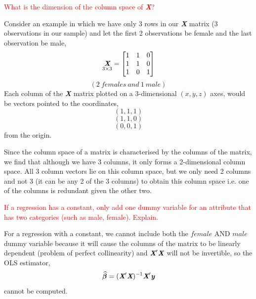 \documentclass[12pt]{report}
\begin{document}
\noindent \textcolor{red}
{
	What is the dimension of the column space of \textit{\textbf{X}}?
}

\noindent Consider an example in which we have only 3 rows in our \textit{\textbf{X}} matrix (3 observations in our sample) and let the first 2 observations be female and the last observation be male,
$$
\underset{3\times3}{\textit{\textbf{X}}}
=
\begin{bmatrix}
1 & 1 & 0\\
1 & 1 & 0\\
1 & 0 & 1
\end{bmatrix}
$$
$$(2\ females\ and\ 1\ male)$$
\noindent Each column of the \textit{\textbf{X}} matrix plotted on a 3-dimensional $(x,y,z)$ axes, would be vectors pointed to the coordinates,
$$(1,1,1)$$
$$(1,1,0)$$
$$(0,0,1)$$
\noindent from the origin.

\noindent Since the column space of a matrix is characterised by the columns of the matrix, we find that although we have 3 columns, it only forms a 2-dimensional column space. All 3 column vectors lie on this column space, but we only need 2 columns and not 3 (it can be any 2 of the 3 columns) to obtain this column space i.e. one of the columns is redundant given the other two.

\noindent \textcolor{red}
{
	If a regression has a constant, only add one dummy variable for an attribute that has two categories (such as male, female). Explain.
}

\noindent For a regression with a constant, we cannot include both the $female$ AND $male$ dummy variable because it will cause the columns of the matrix to be linearly dependent (problem of perfect collinearity) and $\textit{\textbf{X}}'\textit{\textbf{X}}$ will not be invertible, so the OLS estimator, 
$$
\widehat{\boldsymbol{\beta}} 
= (\textit{\textbf{X}}'\textit{\textbf{X}})^{-1}\textit{\textbf{X}}'\textit{\textbf{y}}
$$
\noindent cannot be computed.
\end{document}
